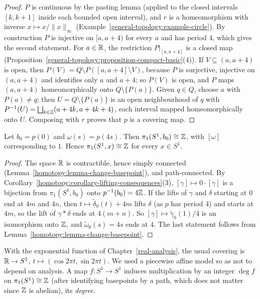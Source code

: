 \begin{proof}
$P$ is continuous by the pasting lemma (applied to the closed intervals $[k, k+1]$ inside each bounded open interval), and $r$ is a homeomorphism with
inverse $x \mapsto x/\|x\|_\infty$ (Example~\ref{general-topology:example-circle}). By construction $P$ is injective on $[a, a + 4)$ for every $a$ and has
period $4$, which gives the second statement. For $a \in \mathbb{R}$, the restriction $P|_{[a, a+4]}$ is a closed map (Proposition~\ref{general-topology:proposition-compact-basic}(4)).
If $V \subseteq (a, a + 4)$ is open, then $P(V) = Q \setminus P([a, a+4] \setminus V)$, because $P$ is surjective, injective on $(a, a+4)$ and identifies only
$a$ and $a + 4$; so $P(V)$ is open, and $P$ maps $(a, a+4)$ homeomorphically onto $Q \setminus \{P(a)\}$. Given $q \in Q$, choose $a$ with $P(a) \neq q$; then
$U = Q \setminus \{P(a)\}$ is an open neighbourhood of $q$ with $P^{-1}(U) = \bigsqcup_{k \in \mathbb{Z}} (a + 4k, a + 4k + 4)$, each interval mapped homeomorphically onto $U$.
Composing with $r$ proves that $p$ is a covering map.
\end{proof}

\begin{theorem}\label{homotopy:theorem-circle}
Let $b_0 = p(0)$ and $\omega(s) = p(4s)$. Then $\pi_1(S^1, b_0) \cong \mathbb{Z}$, with $[\omega]$ corresponding to $1$. Hence $\pi_1(S^1, x) \cong \mathbb{Z}$ for every
$x \in S^1$.
\end{theorem}

\begin{proof}
The space $\mathbb{R}$ is contractible, hence simply connected (Lemma~\ref{homotopy:lemma-change-basepoint}), and path-connected. By
Corollary~\ref{homotopy:corollary-lifting-consequences}(3), $[\gamma] \mapsto 0 \cdot [\gamma]$ is a bijection from $\pi_1(S^1, b_0)$ onto $p^{-1}(b_0) = 4\mathbb{Z}$. If
the lifts of $\gamma$ and $\delta$ starting at $0$ end at $4m$ and $4n$, then $t \mapsto \tilde\delta_0(t) + 4m$ lifts $\delta$ (as $p$ has period $4$) and starts at $4m$, so the
lift of $\gamma * \delta$ ends at $4(m + n)$. So $[\gamma] \mapsto \tilde\gamma_0(1)/4$ is an isomorphism onto $\mathbb{Z}$, and $\tilde\omega_0(s) = 4s$ ends at $4$. The last
statement follows from Lemma~\ref{homotopy:lemma-change-basepoint}.
\end{proof}

\begin{remark}\label{homotopy:remark-exponential}
With the exponential function of Chapter~\ref{real-analysis}, the usual covering is $\mathbb{R} \to S^1$, $t \mapsto (\cos 2\pi t, \sin 2\pi t)$. We used a
piecewise affine model so as not to depend on analysis. A map $f \colon S^1 \to S^1$ induces multiplication by an integer $\deg f$ on
$\pi_1(S^1) \cong \mathbb{Z}$ (after identifying basepoints by a path, which does not matter since $\mathbb{Z}$ is abelian), its \emph{degree}.
\end{remark}


